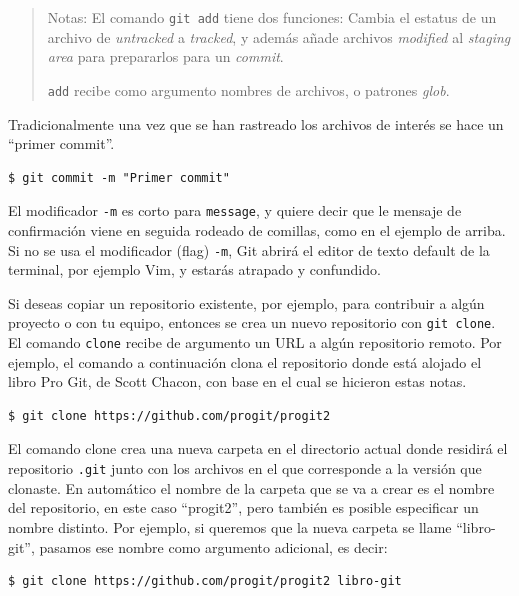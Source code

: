 \documentclass[spanish, 12pt, a4paper]{article}
\begin{document}
\begin{quote}
Notas: El comando \passthrough{\lstinline!git add!} tiene dos funciones:
Cambia el estatus de un archivo de \emph{untracked} a \emph{tracked}, y
además añade archivos \emph{modified} al \emph{staging area} para
prepararlos para un \emph{commit}.

\passthrough{\lstinline!add!} recibe como argumento nombres de archivos,
o patrones \emph{glob}.
\end{quote}

Tradicionalmente una vez que se han rastreado los archivos de interés se
hace un ``primer commit''.

\begin{lstlisting}
$ git commit -m "Primer commit"
\end{lstlisting}

El modificador \passthrough{\lstinline!-m!} es corto para
\passthrough{\lstinline!message!}, y quiere decir que le mensaje de
confirmación viene en seguida rodeado de comillas, como en el ejemplo de
arriba. Si no se usa el modificador (flag) \passthrough{\lstinline!-m!},
Git abrirá el editor de texto default de la terminal, por ejemplo Vim, y
estarás atrapado y confundido.

Si deseas copiar un repositorio existente, por ejemplo, para contribuir
a algún proyecto o con tu equipo, entonces se crea un nuevo repositorio
con \passthrough{\lstinline!git clone!}. El comando
\passthrough{\lstinline!clone!} recibe de argumento un URL a algún
repositorio remoto. Por ejemplo, el comando a continuación clona el
repositorio donde está alojado el libro Pro Git, de Scott Chacon, con
base en el cual se hicieron estas notas.

\begin{lstlisting}
$ git clone https://github.com/progit/progit2
\end{lstlisting}

El comando clone crea una nueva carpeta en el directorio actual donde
residirá el repositorio \passthrough{\lstinline!.git!} junto con los
archivos en el que corresponde a la versión que clonaste. En automático
el nombre de la carpeta que se va a crear es el nombre del repositorio,
en este caso ``progit2'', pero también es posible especificar un nombre
distinto. Por ejemplo, si queremos que la nueva carpeta se llame
``libro-git'', pasamos ese nombre como argumento adicional, es decir:

\begin{lstlisting}
$ git clone https://github.com/progit/progit2 libro-git
\end{lstlisting}
\end{document}
